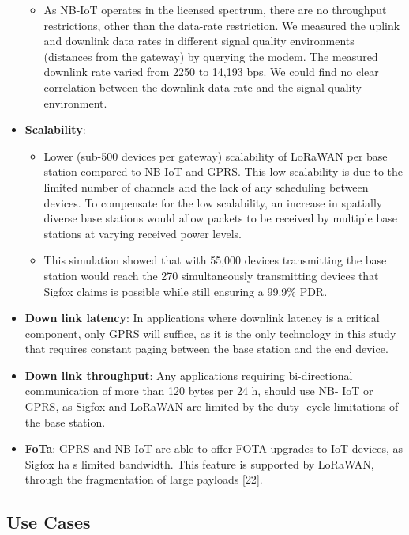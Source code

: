 \documentclass[]{article}
\providecommand{\tightlist}{%
  \setlength{\itemsep}{0pt}\setlength{\parskip}{0pt}}
\begin{document}
\begin{itemize}
  \begin{itemize}
  \tightlist
  \item
    As NB-IoT operates in the licensed spectrum, there are no throughput
    restrictions, other than the data-rate restriction. We measured the
    uplink and downlink data rates in different signal quality
    environments (distances from the gateway) by querying the modem. The
    measured downlink rate varied from 2250 to 14,193 bps. We could find
    no clear correlation between the downlink data rate and the signal
    quality environment.
  \end{itemize}
\item
  \textbf{Scalability}:

  \begin{itemize}
  \tightlist
  \item
    Lower (sub-500 devices per gateway) scalability of LoRaWAN per base
    station compared to NB-IoT and GPRS. This low scalability is due to
    the limited number of channels and the lack of any scheduling
    between devices. To compensate for the low scalability, an increase
    in spatially diverse base stations would allow packets to be
    received by multiple base stations at varying received power levels.
  \item
    This simulation showed that with 55,000 devices transmitting the
    base station would reach the 270 simultaneously transmitting devices
    that Sigfox claims is possible while still ensuring a 99.9\% PDR.
  \end{itemize}
\item
  \textbf{Down link latency}: In applications where downlink latency is
  a critical component, only GPRS will suffice, as it is the only
  technology in this study that requires constant paging between the
  base station and the end device.
\item
  \textbf{Down link throughput}: Any applications requiring
  bi-directional communication of more than 120 bytes per 24 h, should
  use NB- IoT or GPRS, as Sigfox and LoRaWAN are limited by the duty-
  cycle limitations of the base station.
\item
  \textbf{FoTa}: GPRS and NB-IoT are able to offer FOTA upgrades to IoT
  devices, as Sigfox ha s limited bandwidth. This feature is supported
  by LoRaWAN, through the fragmentation of large payloads {[}22{]}.
\end{itemize}

\hypertarget{usecases_intro}{%
\subsection{Use Cases}\label{usecases_intro}}
\end{document}
